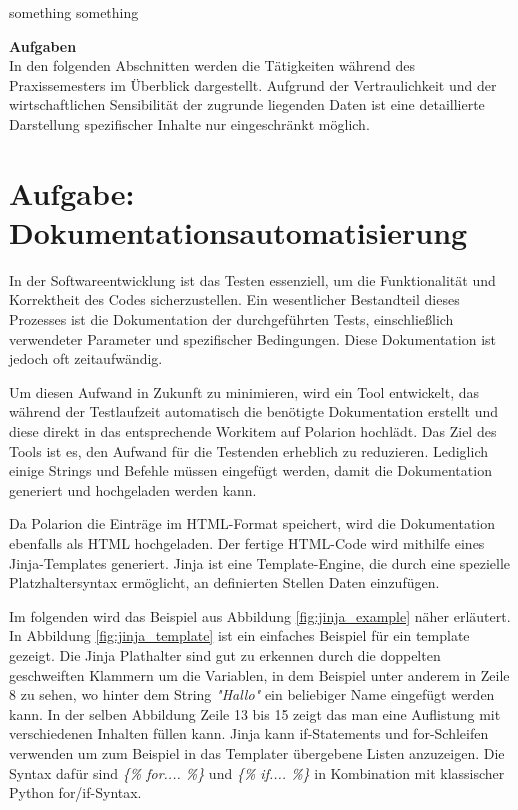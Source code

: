 \documentclass[a4paper, 12pt]{article}
\begin{document}
something something  %
\cite{scrum2020}

\newpage
{\bfseries \large Aufgaben}\label{Aufgaben}\\
In den folgenden Abschnitten werden die Tätigkeiten während des Praxissemesters im Überblick dargestellt. Aufgrund der Vertraulichkeit und der wirtschaftlichen Sensibilität der zugrunde liegenden Daten ist eine detaillierte Darstellung spezifischer Inhalte nur eingeschränkt möglich.

\section{Aufgabe: Dokumentationsautomatisierung}\label{Dokumentationsautomatisierung}
In der Softwareentwicklung ist das Testen essenziell, um die Funktionalität und Korrektheit des Codes sicherzustellen.  Ein wesentlicher Bestandteil dieses Prozesses ist die Dokumentation der durchgeführten Tests, einschließlich verwendeter Parameter und spezifischer Bedingungen. Diese Dokumentation ist jedoch oft zeitaufwändig.

Um diesen Aufwand in Zukunft zu minimieren, wird ein Tool entwickelt, das während der Testlaufzeit automatisch die benötigte Dokumentation erstellt und diese direkt in das entsprechende Workitem auf Polarion hochlädt. Das Ziel des Tools ist es, den Aufwand für die Testenden erheblich zu reduzieren. Lediglich einige Strings und Befehle müssen eingefügt werden, damit die Dokumentation generiert und hochgeladen werden kann.

Da Polarion die Einträge im HTML-Format speichert, wird die Dokumentation ebenfalls als HTML hochgeladen. Der fertige HTML-Code wird mithilfe eines Jinja-Templates generiert. Jinja ist eine Template-Engine, die durch eine spezielle Platzhaltersyntax ermöglicht, an definierten Stellen Daten einzufügen.

Im folgenden wird das Beispiel aus Abbildung \ref{fig:jinja_example} näher erläutert. In Abbildung \ref{fig:jinja_template} ist ein einfaches Beispiel für ein template gezeigt. Die Jinja Plathalter sind gut zu erkennen durch die doppelten geschweiften Klammern um die Variablen, in dem Beispiel unter anderem in Zeile 8 zu sehen, wo hinter dem String \textit{"Hallo"} ein beliebiger Name eingefügt werden kann. In der selben Abbildung Zeile 13 bis 15 zeigt das man eine Auflistung mit verschiedenen Inhalten füllen kann. Jinja kann if-Statements und for-Schleifen verwenden um zum Beispiel in das Templater übergebene Listen anzuzeigen. Die Syntax dafür sind  \textit{\{\% for.... \%\}}  und \textit{\{\% if.... \%\}} in Kombination mit klassischer Python for/if-Syntax. 
\end{document}
